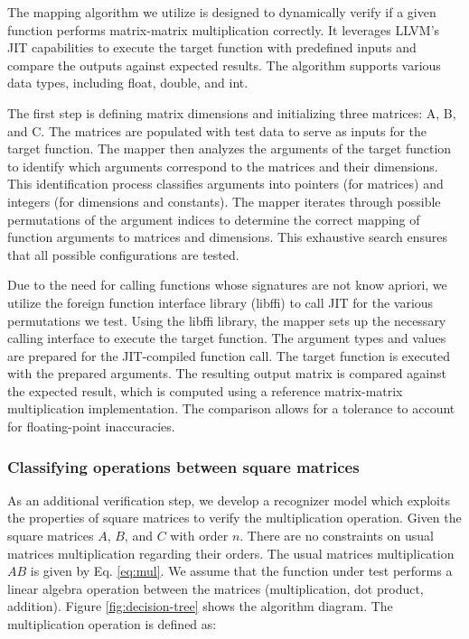 \documentclass[manuscript,screen,review]{acmart}
\begin{document}
The mapping algorithm we utilize is designed to dynamically verify if a given function performs matrix-matrix multiplication correctly. It leverages LLVM's JIT capabilities to execute the target function with predefined inputs and compare the outputs against expected results. The algorithm supports various data types, including float, double, and int.


The first step is defining matrix dimensions and initializing three matrices: A, B, and C. The matrices are populated with test data to serve as inputs for the target function. The mapper then analyzes the arguments of the target function to identify which arguments correspond to the matrices and their dimensions. This identification process classifies arguments into pointers (for matrices) and integers (for dimensions and constants).
The mapper iterates through possible permutations of the argument indices to determine the correct mapping of function arguments to matrices and dimensions. This exhaustive search ensures that all possible configurations are tested.

Due to the need for calling functions whose signatures are not know apriori, we utilize the foreign function interface library (libffi) to call JIT for the various permutations we test. Using the libffi library, the mapper sets up the necessary calling interface to execute the target function. The argument types and values are prepared for the JIT-compiled function call. The target function is executed with the prepared arguments. The resulting output matrix is compared against the expected result, which is computed using a reference matrix-matrix multiplication implementation. The comparison allows for a tolerance to account for floating-point inaccuracies.

\subsubsection{Classifying operations between square matrices}

As an additional verification step, we develop a recognizer model which exploits the properties of square matrices to verify the multiplication operation. Given the square matrices \(A\), \(B\), and \(C\) with order \(n\). There are no constraints on usual matrices multiplication regarding their orders. The usual matrices multiplication \(AB\) is given by Eq. \eqref{eq:mul}. We assume that the function under test performs a linear algebra operation between the matrices (multiplication, dot product, addition). Figure \ref{fig:decision-tree} shows the algorithm diagram. The multiplication operation is defined as:
\end{document}

